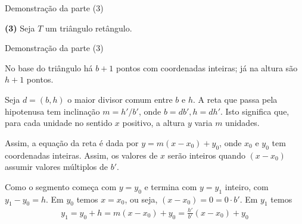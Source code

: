 \begin{frame}[fragile]{Demonstração da parte (3)}

    \textbf{(3)} Seja $T$ um triângulo retângulo.

    \begin{figure}
        \centering

    \end{figure}

\end{frame}


\begin{frame}[fragile]{Demonstração da parte (3)}

    No base do triângulo há $b + 1$ pontos com coordenadas inteiras; já na altura são
    $h + 1$ pontos. 

    Seja $d = (b, h)$ o maior divisor comum entre $b$ e $h$. A reta que passa pela hipotenusa
    tem inclinação $m = h'/b'$, onde $b = db', h = dh'$. Isto significa que, para cada unidade
    no sentido $x$ positivo, a altura $y$ varia $m$ unidades.

    Assim, a equação da reta é dada por $y = m(x - x_0) + y_0$, onde $x_0$ e $y_0$ tem coordenadas 
    inteiras. Assim, os valores de $x$ serão inteiros quando $(x - x_0)$ assumir valores múltiplos 
    de $b'$.
        
    Como o segmento começa com $y = y_0$ e termina com $y = y_1$ inteiro, com $y_1 - y_0 = h$.
    Em $y_0$ temos $x = x_0$, ou seja, $(x - x_0) = 0 = 0\cdot b'$. Em $y_1$ temos
    \begin{align*}
       y_1 = y_0 + h = m(x - x_0) + y_0 = \frac{h'}{b'}(x - x_0) + y_0
    \end{align*}
             
\end{frame}

